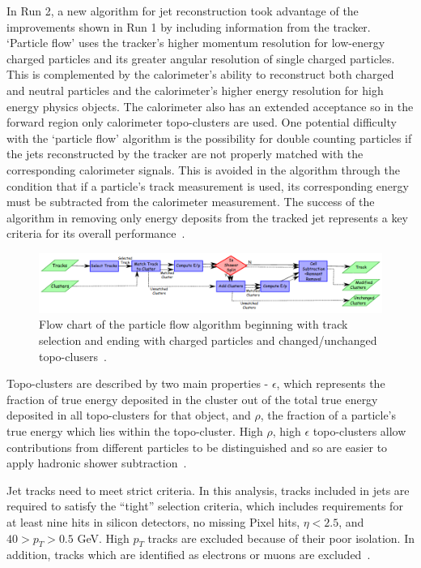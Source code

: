 In Run 2, a new algorithm for jet reconstruction took advantage of the improvements shown in Run 1 by including information from the tracker. `Particle flow' uses the tracker's higher momentum resolution for low-energy charged particles and its greater angular resolution of single charged particles. This is complemented by the calorimeter's ability to reconstruct both charged and neutral particles and the calorimeter's higher energy resolution for high energy physics objects. The calorimeter also has an extended acceptance so in the forward region only calorimeter topo-clusters are used. One potential difficulty with the `particle flow' algorithm is the possibility for double counting particles if the jets reconstructed by the tracker are not properly matched with the corresponding calorimeter signals. This is avoided in the algorithm through the condition that if a particle's track measurement is used, its corresponding energy must be subtracted from the calorimeter measurement. The success of the algorithm in removing only energy deposits from the tracked jet represents a key criteria for its overall performance~\cite{ParticleFlow}.

\begin{figure}[!h]
        \centering
    \includegraphics[width=.85\textwidth]{Pictures/ParticleFlow.png}
    \caption{Flow chart of the particle flow algorithm beginning with track selection and ending with charged particles and changed/unchanged topo-clusers~\cite{ParticleFlow}.}
    \label{fig:ParticleFlow}
\end{figure}

Topo-clusters are described by two main properties - $\epsilon$, which represents the fraction of true energy deposited in the cluster out of the total true energy deposited in all topo-clusters for that object, and $\rho$, the fraction of a particle's true energy which lies within the topo-cluster. High $\rho$, high $\epsilon$ topo-clusters allow contributions from different particles to be distinguished and so are easier to apply hadronic shower subtraction~\cite{ParticleFlow}.

Jet tracks need to meet strict criteria. In this analysis, tracks included in jets are required to satisfy the ``tight'' selection criteria, which includes requirements for at least nine hits in silicon detectors, no missing Pixel hits, $\eta<2.5$, and $40>p_T>0.5$ GeV. High $p_T$ tracks are excluded because of their poor isolation. In addition, tracks which are identified as electrons or muons are excluded~\cite{ParticleFlow}. 

